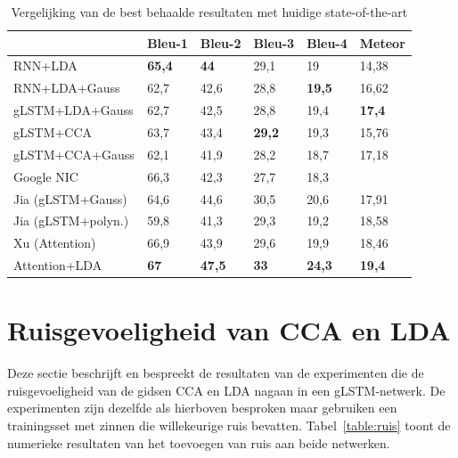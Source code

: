 \begin{table}
	\centering
	\begin{tabular}{llllll}
		~                  & Bleu-1 & Bleu-2 & Bleu-3 & Bleu-4 & Meteor \\ \hline
		RNN+LDA            & \textbf{65,4}   & \textbf{44}     & 29,1   & 19     & 14,38  \\
		RNN+LDA+Gauss      & 62,7   & 42,6   & 28,8   & \textbf{19,5}   & 16,62  \\
		gLSTM+LDA+Gauss    & 62,7   & 42,5   & 28,8   & 19,4   & \textbf{17,4}   \\
		gLSTM+CCA          & 63,7   & 43,4   & \textbf{29,2}   & 19,3   & 15,76  \\
		gLSTM+CCA+Gauss    & 62,1   & 41,9   & 28,2   & 18,7   & 17,18  \\ \hline
		
		Google NIC~\cite{Google}           & 66,3   & 42,3   & 27,7   & 18,3   & ~      \\
		Jia (gLSTM+Gauss)~\cite{Fernando2015}  & 64,6   & 44,6   & 30,5   & 20,6   & 17,91  \\
		Jia (gLSTM+polyn.)~\cite{Fernando2015} & 59,8   & 41,3   & 29,3   & 19,2   & 18,58  \\
		Xu (Attention)~\cite{Xu2015}     & 66,9   & 43,9   & 29,6   & 19,9   & 18,46  \\
		Attention+LDA~\cite{Jin2015}      & \textbf{67}    & \textbf{47,5}   & \textbf{33}     & \textbf{24,3}   & \textbf{19,4}   \\ \hline
	\end{tabular}
	\caption{Vergelijking van de best behaalde resultaten met huidige state-of-the-art}
	\label{table:sota}
\end{table}

\section{Ruisgevoeligheid van CCA en LDA} %
\label{sec:ruisgevoeligheid_van_cca_en_lda_res}
Deze sectie beschrijft en bespreekt de resultaten van de experimenten die de ruisgevoeligheid van de gidsen CCA en LDA nagaan in een gLSTM-netwerk.
De experimenten zijn dezelfde als hierboven besproken maar gebruiken een trainingsset met zinnen die willekeurige ruis bevatten.
Tabel~\ref{table:ruis} toont de numerieke resultaten van het toevoegen van ruis aan beide netwerken.


